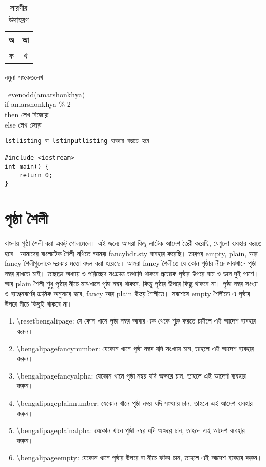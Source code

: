 \documentclass[a4paper,10pt,xetex]{article}
\begin{document}
\begin{table}
‌\centering
\caption{সারণীর উদাহরণ}
‌\begin{tabular}{|c|c|}
\hline
অ & আ‌‌\\\hline
ক & খ\\\hline
\end{tabular}
\end{table}

\begin{algorithm}
\caption{নমুনা সংকেতলেখ}
\begin{procedure}[H]
‌\procedurename~evenodd(amarshonkhya)\\
‍‍ ‍ ‍ ‍ ‍ ‍ if amarshonkhya \% 2\\
‍ ‍ ‍ ‍ ‍ ‍ then লেখ বিজোড়\\
‍ ‍ ‍ ‍ ‍ ‍ else লেখ জোড়
\end{procedure}
\end{algorithm}

\begin{lstlisting}[frame=single,caption={নমুনা ফিরিস্তি}]
lstlisting বা lstinputlisting ব্যবহার করতে হবে।

#include <iostream>
int main() {
    return 0;
}
\end{lstlisting}

\section{পৃষ্ঠা শৈলী}
বাংলায় পৃষ্ঠা শৈলী করা একটু গোলমেলে। এই জন্যে আমরা কিছু লাটেক আদেশ তৈরী করেছি, যেগুলো ব্যবহার করতে হবে। আমাদের বাংলাটেক শৈলী নথিতে আমরা fancyhdr.sty ব্যবহার করেছি। তারপর empty, plain, আর fancy শৈলীগুলোকে দরকার মতো বদল করা হয়েছে। আমরা fancy শৈলীতে যে কোন পৃষ্ঠার নীচে মাঝখানে পৃষ্ঠা নম্বর রাখতে চাই। তাছাড়া অধ্যায় ও পরিচ্ছেদ সংক্রান্ত তথ্যাদি থাকবে প্রত্যেক পৃষ্ঠার উপরে বাম ও ডান দুই পাশে। আর plain শৈলী শুধু পৃষ্ঠার নীচে মাঝখানে পৃষ্ঠা নম্বর থাকবে, কিন্তু পৃষ্ঠার উপরে কিছু থাকবে না। পৃষ্ঠা নম্বর সংখ্যা ও ব্যাঞ্জনবর্ণের ক্রমিক অনুসারে হবে, fancy আর plain উভয় শৈলীতে। সবশেষে empty শৈলীতে এ পৃষ্ঠার উপরে নীচে কিছুই থাকবে না।

\begin{enumerate}
\item \textbackslash{\rm resetbengalipage}: যে কোন খানে পৃষ্ঠা নম্বর আবার এক থেকে শুরু করতে চাইলে এই আদেশ ব্যবহার করুন।
\item \textbackslash{\rm bengalipagefancynumber}: যেকোন খানে পৃষ্ঠা নম্বর যদি সংখ্যায় চান, তাহলে এই আদেশ ব্যবহার করুন।
\item \textbackslash{\rm bengalipagefancyalpha}: যেকোন খানে পৃষ্ঠা নম্বর যদি অক্ষরে চান, তাহলে এই আদেশ ব্যবহার করুন।
\item \textbackslash{\rm bengalipageplainnumber}: যেকোন খানে পৃষ্ঠা নম্বর যদি সংখ্যায় চান, তাহলে এই আদেশ ব্যবহার করুন।
\item \textbackslash{\rm bengalipageplainalpha}: যেকোন খানে পৃষ্ঠা নম্বর যদি অক্ষরে চান, তাহলে এই আদেশ ব্যবহার করুন।
\item \textbackslash{\rm bengalipageempty}: যেকোন খানে পৃষ্ঠার উপরে বা নীচে ফাঁকা চান, তাহলে এই আদেশ ব্যবহার করুন।
\end{enumerate}
\end{document}
